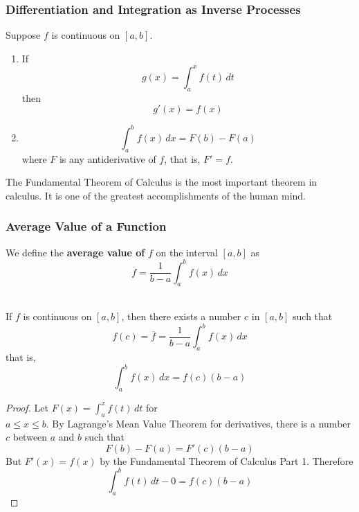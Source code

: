 \subsubsection*{Differentiation and Integration as Inverse Processes}
\begin{theorem}
    Suppose \(f\) is continuous on \([a,b]\).
    \begin{enumerate}
        \item If
        \[g(x)=\int_a^x f(t)\,dt\]
        then
        \[g'(x)=f(x)\]
        \item
        \[\int_a^b f(x)\,dx=F(b)-F(a)\]
        where \(F\) is any antiderivative of \(f\), that is, \(F'=f\).
    \end{enumerate}
\end{theorem}
The Fundamental Theorem of Calculus is the most important theorem in calculus.
It is one of the greatest accomplishments of the human mind.

\subsubsection*{Average Value of a Function}
We define the \textbf{average value of} \(f\) on the interval \([a,b]\) as
\[\overline{f}=\frac{1}{b-a}\int_a^b f(x)\,dx\]\
\begin{theorem}
    If \(f\) is continuous on \([a,b]\), then there exists a number \(c\) in
    \([a,b]\) such that
    \[f(c)=\overline{f}=\frac{1}{b-a}\int_a^b f(x)\,dx\]
    that is,
    \[\int_a^b f(x)\,dx=f(c)(b-a)\]
\end{theorem}
\begin{proof}
    Let \(\displaystyle{F(x)=\int_a^x f(t)\,dt}\) for \\
    \(a\leq x\leq b\).
    By Lagrange's Mean Value Theorem for derivatives, there is a number \(c\)
    between \(a\) and \(b\) such that
    \[F(b)-F(a)=F'(c)(b-a)\]
    But \(F'(x)=f(x)\) by the Fundamental Theorem of Calculus Part 1.
    Therefore
    \[\int_a^b f(t)\,dt-0=f(c)(b-a)\]
\end{proof}